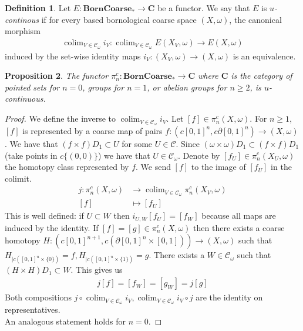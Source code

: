 \documentclass[a4paper,11pt]{article}
\theoremstyle{definition}
\newtheorem{definition}{Definition}[section]
\theoremstyle{plain}
\newtheorem{prop}[definition]{Proposition}
\theoremstyle{remark}
\DeclareMathOperator{\colim}{colim}
\begin{document}
\begin{definition} Let $E: \textbf{BornCoarse}_{*}\rightarrow \mathbf{C}$ be a functor. We say that $E$ is \textit{$u$-continous} if for every based bornological coarse space $(X,\omega)$, the canonical morphism 
\begin{align*}
\colim_{V \in \mathcal{C}_{\omega}} i_{V}: \colim_{V \in \mathcal{C}_{\omega}} E(X_{V},\omega)\rightarrow E(X,\omega)
\end{align*}
induced by the set-wise identity maps $i_{V}:  (X_{V},\omega) \rightarrow (X,\omega)$ is an equivalence.
\end{definition}


\begin{prop} The functor $\pi^{c}_{n}:  \textbf{BornCoarse}_{*} \rightarrow \mathbf{C}$ where $\mathbf{C}$ is the category of pointed sets for $n=0$, groups for $n=1$, or abelian groups for $n\geq 2$, is $u$-continuous. 
\end{prop}

\begin{proof} We define the inverse to $\colim_{V\in \mathcal{C}_{\omega}}i_{V}$. Let $[f]\in \pi_{n}^{c}(X,\omega)$. For $n\geq 1$, $[f]$ is represented by a coarse map of pairs $f:(c[0,1]^n,c\partial[0,1]^n)\rightarrow (X,\omega)$. We have that $(f \times f)D_{1}\subset U$ for some $U\in \mathcal{C}$. Since $(\omega \times \omega) D_{1}\subset (f\times f)D_{1}$ (take points in $c\{(0,0)\}$) we have that $U\in \mathcal{C}_{\omega}$. Denote by $[f_{U}]\in \pi_{n}^{c}(X_{U},\omega)$ the homotopy class represented by $f$. We send $[f]$ to the image of $[f_{U}]$ in the colimit. 
\begin{align*}
j: \pi_{n}^{c}(X,\omega)&\rightarrow \colim_{V\in \mathcal{C}_{\omega}} \pi_{n}^{c} (X_{V},\omega)\\
[f]&\mapsto [f_{U}]
\end{align*}
This is well defined: if $U\subset W$ then $i_{U,W}[f_{U}] = [f_{W}]$ because all maps are induced by the identity. If $[f]=[g] \in \pi_{n}^{c}(X,\omega)$ then there exists a coarse homotopy $H: (c[0,1]^{n+1}, c(\partial[0,1]^n \times [0,1])) \rightarrow (X,\omega)$ such that $H_{|c([0,1]^{n}\times \{0\})} =f, H_{|c([0,1]^{n}\times \{1\})} = g$.  There exists a $W\in \mathcal{C}_{\omega}$ such that $(H \times H)D_{1}\subset W$. This gives us 
\begin{align*}
j[f] = [f_{W}] = [g_{W}] = j[g]
\end{align*}
Both compositions $j\circ \colim_{V\in \mathcal{C}_{\omega}} i_{V}, \colim_{V\in \mathcal{C}_{\omega}} i_{V} \circ j$ are the identity on representatives. \\

An analogous statement holds for $n=0$.
\end{proof} 
\end{document}
